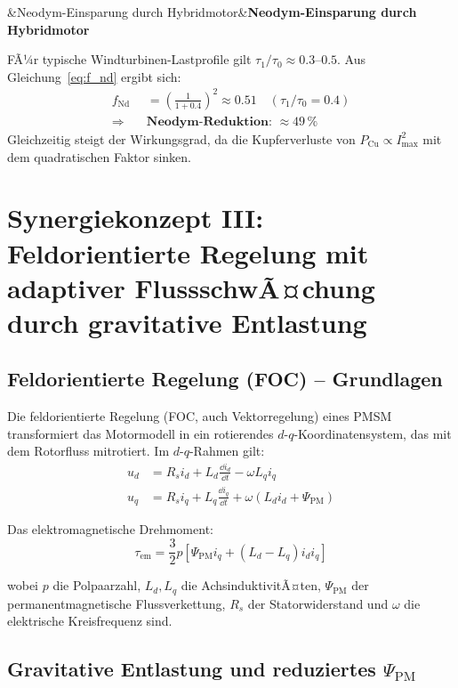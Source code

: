 ﻿\documentclass[12pt, a4paper]{report}
\newenvironment{ergebnis}[1][]{%
  \begin{ergebnisframe}\sloppy%
  \ifx&#1&\else\textbf{#1}\par\smallskip\fi}{\end{ergebnisframe}}
\theoremstyle{definition}
\theoremstyle{remark}
\begin{document}
\begin{ergebnis}[Neodym-Einsparung durch Hybridmotor]
  FÃ¼r typische Windturbinen-Lastprofile gilt $\tau_1/\tau_0 \approx 0.3$--$0.5$.
  Aus Gleichung~\eqref{eq:f_nd} ergibt sich:
  \begin{align}
    f_{\text{Nd}} &= \left(\frac{1}{1+0.4}\right)^2 \approx 0.51 \quad (\tau_1/\tau_0 = 0.4) \\
    \Rightarrow \quad &\textbf{Neodym-Reduktion: } \approx 49\,\%
  \end{align}
  Gleichzeitig steigt der Wirkungsgrad, da die Kupferverluste von
  $P_{\text{Cu}} \propto I_{\max}^2$ mit dem quadratischen Faktor sinken.
\end{ergebnis}

\section{Synergiekonzept III: Feldorientierte Regelung mit adaptiver
            FlussschwÃ¤chung durch gravitative Entlastung}
\label{ssec:synergie3}

\subsection{Feldorientierte Regelung (FOC) -- Grundlagen}

Die feldorientierte Regelung (FOC, auch Vektorregelung) eines PMSM transformiert
das Motormodell in ein rotierendes $d$-$q$-Koordinatensystem, das mit dem
Rotorfluss mitrotiert. Im $d$-$q$-Rahmen gilt:
\begin{align}
  u_d &= R_s i_d + L_d \frac{\dd i_d}{\dd t} - \omega L_q i_q
  \label{eq:ud} \\
  u_q &= R_s i_q + L_q \frac{\dd i_q}{\dd t} + \omega (L_d i_d + \Psi_{\text{PM}})
  \label{eq:uq}
\end{align}

Das elektromagnetische Drehmoment:
\begin{equation}
  \tau_{\text{em}} = \frac{3}{2} p \left[\Psi_{\text{PM}} i_q
                  + (L_d - L_q) i_d i_q\right]
  \label{eq:tau_em_dq}
\end{equation}

wobei $p$ die Polpaarzahl, $L_d, L_q$ die AchsinduktivitÃ¤ten, $\Psi_{\text{PM}}$
der permanentmagnetische Flussverkettung, $R_s$ der Statorwiderstand und
$\omega$ die elektrische Kreisfrequenz sind.

\subsection{\texorpdfstring{Gravitative Entlastung und reduziertes $\Psi_{\text{PM}}$}{Gravitative Entlastung und reduziertes Psi\_PM}}
\end{document}
